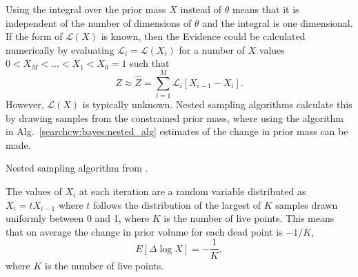 Using the integral over the prior mass $X$ instead of $\theta$ means that it is independent of the number of dimensions of $\theta$ and the integral is one dimensional.
If the form of $\mathcal{L}(X)$ is known, then the Evidence could be calculated numerically by evaluating $\mathcal{L}_i = \mathcal{L}(X_i)$ for a number of $X$ values $0 < X_M < ... < X_1 < X_0 = 1$ such that
\begin{equation}
Z \approx \hat{Z} = \sum_{i=1}^{M} \mathcal{L}_i \left[  X_{i-1} - X_{i}\right].
\end{equation} 
However, $\mathcal{L}(X)$  is typically unknown.
Nested sampling algorithms calculate this by drawing samples from the constrained prior mass, where using the algorithm in Alg.~\ref{searchcw:bayes:nested_alg} estimates of the change in prior mass can be made.
%
\begin{algorithm}
	\centering
	\begin{algorithmic}[1]
		 
		
		
		 
		 
		\ENDWHILE
		
			 
			 
		\ENDWHILE
		\STATE
		
	\end{algorithmic}
	\caption[Nested sampling algorithm]{ Nested sampling algorithm from \citep{speagle2019DynestyDynamic}. \label{searchcw:bayes:nested_alg}}
\end{algorithm}
%
The values of $X_i$ at each iteration are a random variable distributed as $X_i = t X_{i-1}$ where $t$ follows the distribution of the largest of $K$ samples drawn uniformly between 0 and 1, where $K$ is the number of live points. 
This means that on average the change in prior volume for each dead point is $-1/K$,
\begin{equation}
\label{searchcw:bayes:nested:exp}
	E[ \Delta \log X] = - \frac{1}{K},
\end{equation}
where $K$ is the number of live points.


